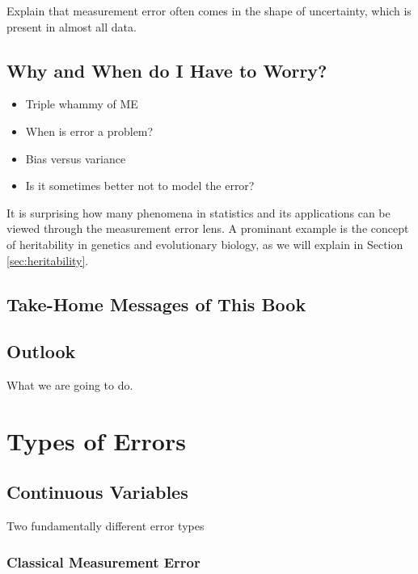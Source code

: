 \documentclass[]{book}
\providecommand{\tightlist}{%
  \setlength{\itemsep}{0pt}\setlength{\parskip}{0pt}}
\theoremstyle{definition}
\theoremstyle{definition}
\theoremstyle{definition}
\theoremstyle{remark}
\begin{document}
Explain that measurement error often comes in the shape of uncertainty,
which is present in almost all data.

\section{Why and When do I Have to
Worry?}\label{why-and-when-do-i-have-to-worry}

\begin{itemize}
\tightlist
\item
  Triple whammy of ME
\item
  When is error a problem?
\item
  Bias versus variance
\item
  Is it sometimes better not to model the error?
\end{itemize}

It is surprising how many phenomena in statistics and its applications
can be viewed through the measurement error lens. A prominant example is
the concept of heritability in genetics and evolutionary biology, as we
will explain in Section \ref{sec:heritability}.

\section{Take-Home Messages of This
Book}\label{take-home-messages-of-this-book}

\section{Outlook}\label{outlook}

What we are going to do.

\chapter{Types of Errors}\label{types-of-errors}

\section{Continuous Variables}\label{sec:errortypes}

Two fundamentally different error types

\subsection{Classical Measurement
Error}\label{classical-measurement-error}
\end{document}
